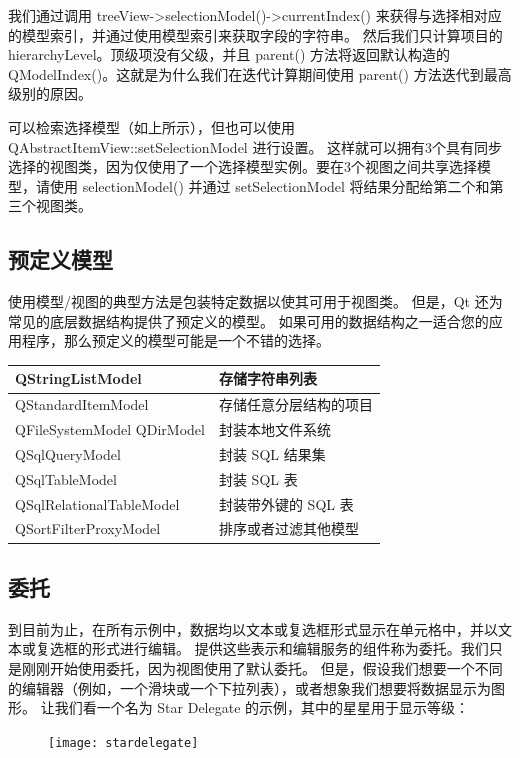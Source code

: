 我们通过调用 treeView->selectionModel()->currentIndex() 来获得与选择相对应的模型索引，并通过使用模型索引来获取字段的字符串。
然后我们只计算项目的hierarchyLevel。顶级项没有父级，并且 parent() 方法将返回默认构造的 QModelIndex()。这就是为什么我们在迭代计算期间使用 parent() 方法迭代到最高级别的原因。

可以检索选择模型（如上所示），但也可以使用 QAbstractItemView::setSelectionModel 进行设置。
这样就可以拥有3个具有同步选择的视图类，因为仅使用了一个选择模型实例。要在3个视图之间共享选择模型，请使用 selectionModel() 并通过 setSelectionModel 将结果分配给第二个和第三个视图类。

\subsection{预定义模型}

使用模型/视图的典型方法是包装特定数据以使其可用于视图类。
但是，Qt 还为常见的底层数据结构提供了预定义的模型。
如果可用的数据结构之一适合您的应用程序，那么预定义的模型可能是一个不错的选择。

\begin{longtable}[l]{|l|l|}
\hline
QStringListModel &	存储字符串列表 \\ 
\hline
QStandardItemModel &	存储任意分层结构的项目\\
\hline
QFileSystemModel
QDirModel	 & 封装本地文件系统\\ 
\hline
QSqlQueryModel &	封装 SQL 结果集\\
\hline
QSqlTableModel	& 封装 SQL 表\\
\hline
QSqlRelationalTableModel &	封装带外键的 SQL 表 \\
\hline
QSortFilterProxyModel	& 排序或者过滤其他模型 \\
\hline
\end{longtable}

\subsection{委托}

到目前为止，在所有示例中，数据均以文本或复选框形式显示在单元格中，并以文本或复选框的形式进行编辑。
提供这些表示和编辑服务的组件称为委托。我们只是刚刚开始使用委托，因为视图使用了默认委托。
但是，假设我们想要一个不同的编辑器（例如，一个滑块或一个下拉列表），或者想象我们想要将数据显示为图形。
让我们看一个名为 Star Delegate 的示例，其中的星星用于显示等级：


\begin{figure}[hbt!]  
\texttt{[image: stardelegate]}
\end{figure}

